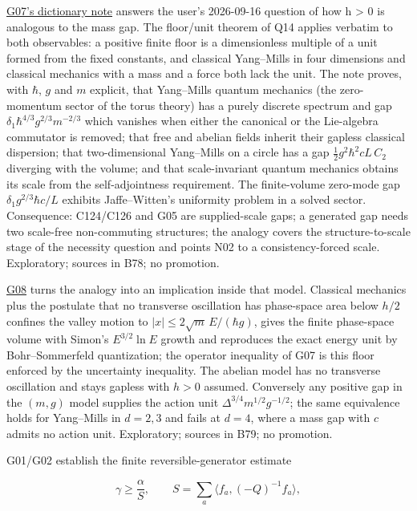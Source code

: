 \documentclass[11pt,a4paper]{article}
\begin{document}
\href{../notes/low-dimensional-mass-gap.md}{G07's dictionary note}
answers the user's 2026-09-16 question of how h \textgreater{} 0 is
analogous to the mass gap. The floor/unit theorem of Q14 applies
verbatim to both observables: a positive finite floor is a dimensionless
multiple of a unit formed from the fixed constants, and classical
Yang--Mills in four dimensions and classical mechanics with a mass and a
force both lack the unit. The note proves, with \(\hbar\), \(g\) and
\(m\) explicit, that Yang--Mills quantum mechanics (the zero-momentum
sector of the torus theory) has a purely discrete spectrum and gap
\(\delta_1\hbar^{4/3}g^{2/3}m^{-2/3}\) which vanishes when either the
canonical or the Lie-algebra commutator is removed; that free and
abelian fields inherit their gapless classical dispersion; that
two-dimensional Yang--Mills on a circle has a gap
\(\tfrac12g^2\hbar^2cL\,C_2\) diverging with the volume; and that
scale-invariant quantum mechanics obtains its scale from the
self-adjointness requirement. The finite-volume zero-mode gap
\(\delta_1g^{2/3}\hbar c/L\) exhibits Jaffe--Witten's uniformity problem
in a solved sector. Consequence: C124/C126 and G05 are supplied-scale
gaps; a generated gap needs two scale-free non-commuting structures; the
analogy covers the structure-to-scale stage of the necessity question
and points N02 to a consistency-forced scale. Exploratory; sources in
B78; no promotion.

\href{../notes/low-dimensional-mass-gap.md#conditional-orbit-area-bounds-and-state-counting}{G08} turns the analogy
into an implication inside that model. Classical mechanics plus the
postulate that no transverse oscillation has phase-space area below
\(h/2\) confines the valley motion to \(|x|\le2\sqrt m\,E/(\hbar g)\),
gives the finite phase-space volume with Simon's \(E^{3/2}\ln E\) growth
and reproduces the exact energy unit by Bohr--Sommerfeld quantization;
the operator inequality of G07 is this floor enforced by the uncertainty
inequality. The abelian model has no transverse oscillation and stays
gapless with \(h>0\) assumed. Conversely any positive gap in the
\((m,g)\) model supplies the action unit
\(\Delta^{3/4}m^{1/2}g^{-1/2}\); the same equivalence holds for
Yang--Mills in \(d=2,3\) and fails at \(d=4\), where a mass gap with
\(c\) admits no action unit. Exploratory; sources in B79; no promotion.

G01/G02 establish the finite reversible-generator estimate

\[\gamma\ge\frac{\alpha}{S},\qquad
S=\sum_a\langle f_a,(-Q)^{-1}f_a\rangle,\]
\end{document}
